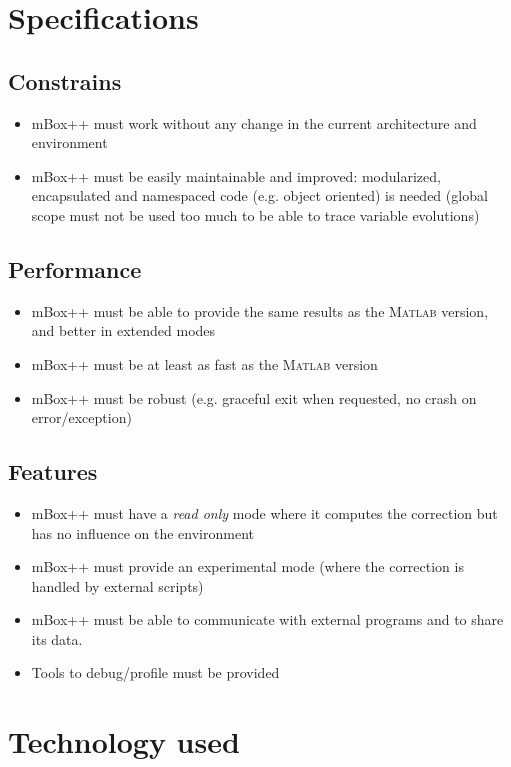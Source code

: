 \section{Specifications}

\subsection{Constrains}
\begin{itemize}
    \item mBox++ must work without any change in the current architecture and environment
    \item mBox++ must be easily maintainable and improved: modularized, encapsulated and namespaced code (e.g. object oriented) is needed (global scope must not be used too much to be able to trace variable evolutions)
\end{itemize}

\subsection{Performance}
\begin{itemize}
    \item mBox++ must be able to provide the same results as the \textsc{Matlab} version, and better in extended modes
    \item mBox++ must be at least as fast as the \textsc{Matlab} version
    \item mBox++ must be robust (e.g. graceful exit when requested, no crash on error/exception)
\end{itemize}

\subsection{Features}
\begin{itemize}
    \item mBox++ must have a \textit{read only} mode where it computes the correction but has no influence on the environment
    \item mBox++ must provide an experimental mode (where the correction is handled by external scripts)
    \item mBox++ must be able to communicate with external programs and to share its data.
    \item Tools to debug/profile must be provided
\end{itemize}

\section{Technology used}

